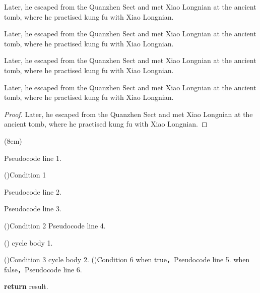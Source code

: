 \documentclass[doctor, vlined, ]{DissertUESTC}
\begin{document}
	\begin{Lemma}[Name]
		Later, he escaped from the Quanzhen Sect and met Xiao Longnian at the ancient tomb, where he practised kung fu with Xiao Longnian.
	\end{Lemma}

	\begin{Example}[Name]
		Later, he escaped from the Quanzhen Sect and met Xiao Longnian at the ancient tomb, where he practised kung fu with Xiao Longnian.
	\end{Example}

	\begin{Assumption}[Name]
		Later, he escaped from the Quanzhen Sect and met Xiao Longnian at the ancient tomb, where he practised kung fu with Xiao Longnian.
	\end{Assumption}

	\begin{Annotation}[Name]
		Later, he escaped from the Quanzhen Sect and met Xiao Longnian at the ancient tomb, where he practised kung fu with Xiao Longnian.
	\end{Annotation}
	
	\begin{proof}
		Later, he escaped from the Quanzhen Sect and met Xiao Longnian at the ancient tomb, where he practised kung fu with Xiao Longnian.
	\end{proof}
	

	\begin{algo}[!h](8em)
		\caption{Example of an algorithm}

		Pseudocode line 1.
		
		\For(){Condition 1}{
			Pseudocode line 2.
			
			Pseudocode line 3.
			
			\DoWhile(){Condition 2}{
				Pseudocode line 4.
			}
			
			\Loop(){
				cycle body 1.
			}
			
			\Repeat(){Condition 3}{
				cycle body 2.
			}
			\eIf(){Condition 6}{
				when true，Pseudocode line 5.
			}{
				when false，Pseudocode line 6.
			}
		}
		\textbf{return} result.
	\end{algo}
	
\end{document}
